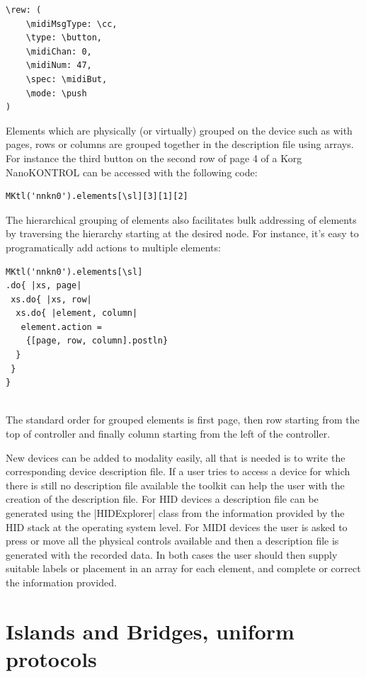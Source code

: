 \documentclass{article}
\begin{document}
\begin{Verbatim}
\rew: (
	\midiMsgType: \cc,
	\type: \button,
	\midiChan: 0,
	\midiNum: 47,
	\spec: \midiBut,
	\mode: \push
)
\end{Verbatim}

Elements which are physically (or virtually) grouped on the device such as with pages, rows or columns are grouped together in the description file using arrays. For instance the third button on the second row of page 4 of a Korg NanoKONTROL can be accessed with the following code:

\begin{Verbatim}
MKtl('nnkn0').elements[\sl][3][1][2]
\end{Verbatim}

The hierarchical grouping of elements also facilitates bulk addressing of elements by traversing the hierarchy starting at the desired node. For instance, it's easy to programatically add actions to multiple elements:

\begin{Verbatim}
MKtl('nnkn0').elements[\sl]
.do{ |xs, page|
 xs.do{ |xs, row|
  xs.do{ |element, column|
   element.action = 
    {[page, row, column].postln}
  }
 }
}
  		
\end{Verbatim}

The standard order for grouped elements is first page, then row starting from the top of controller and finally column starting from the left of the controller.

New devices can be added to modality easily, all that is needed is to write the corresponding device description file. If a user tries to access a device for which there is still no description file available the toolkit can help the user with the creation of the description file. For HID devices a description file can be generated using the |HIDExplorer| class from the information provided by the HID stack at the operating system level. For MIDI devices the user is asked to press or move all the physical controls available and then a description file is generated with the recorded data. In both cases the user should then supply suitable labels or placement in an array for each element, and complete or correct the information provided.





\section{Islands and Bridges, uniform protocols}
\label{sec:islands_and_bridges_uniform_protocols}
\end{document}
